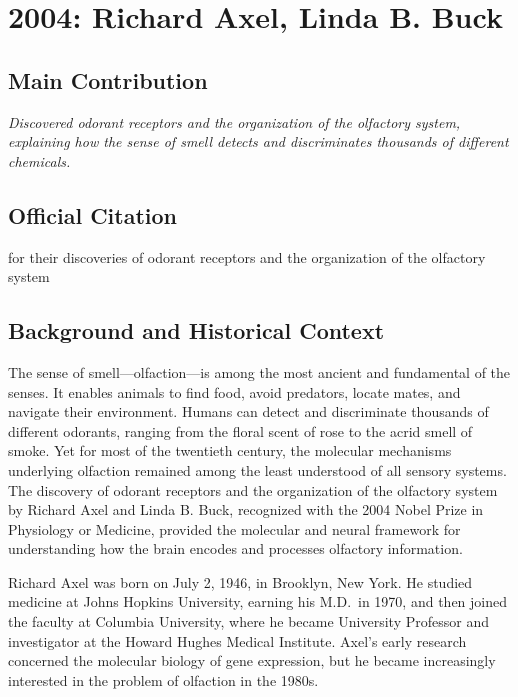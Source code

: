 \chapter[2004 --- Axel et al.]{2004: Richard Axel, Linda B. Buck}
\label{ch:2004_Axel}

\section*{Main Contribution}

\textit{Discovered odorant receptors and the organization of the olfactory system, explaining how the sense of smell detects and discriminates thousands of different chemicals.}\cite{nobel-2004,lecture-2004}

\section{Official Citation}

for their discoveries of odorant receptors and the organization of the olfactory system

\section{Background and Historical Context}

The sense of smell---olfaction---is among the most ancient and fundamental of the senses. It enables animals to find food, avoid predators, locate mates, and navigate their environment. Humans can detect and discriminate thousands of different odorants, ranging from the floral scent of rose to the acrid smell of smoke. Yet for most of the twentieth century, the molecular mechanisms underlying olfaction remained among the least understood of all sensory systems. The discovery of odorant receptors and the organization of the olfactory system by Richard Axel and Linda B. Buck, recognized with the 2004 Nobel Prize in Physiology or Medicine, provided the molecular and neural framework for understanding how the brain encodes and processes olfactory information.

Richard Axel was born on July 2, 1946, in Brooklyn, New York. He studied medicine at Johns Hopkins University, earning his M.D.\ in 1970, and then joined the faculty at Columbia University, where he became University Professor and investigator at the Howard Hughes Medical Institute. Axel's early research concerned the molecular biology of gene expression, but he became increasingly interested in the problem of olfaction in the 1980s.

